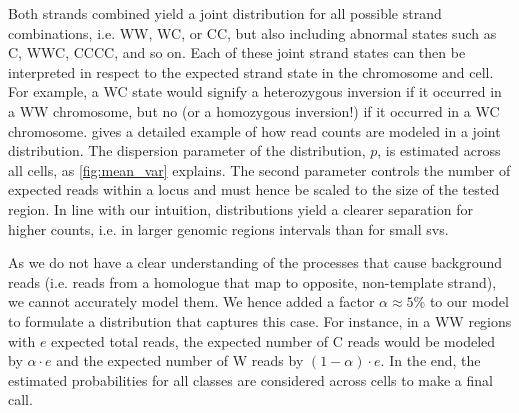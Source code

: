 Both strands combined yield a joint distribution for all possible strand
combinations, i.e. WW, WC, or CC, but also including abnormal states such as C, WWC, CCCC,
and so on. Each of these joint strand states can then be interpreted in respect
to the expected strand state in the chromosome and cell. For example, a WC state would
signify a heterozygous inversion if it occurred in a WW chromosome, but no \sv
(or a homozygous inversion!) if it occurred in a WC chromosome.
 gives a detailed example of how read counts are modeled
in a joint \nb distribution. The dispersion parameter of the \nb distribution,
$p$, is estimated across all cells, as \cref{fig:mean_var} explains. The second
\nb parameter controls the number of expected reads within a locus and must
hence be scaled to the size of the tested region. In line with our intuition,
\nb distributions yield a clearer separation for higher counts, i.e. in larger
genomic regions intervals than for small \acp{sv}.

As we do not have a clear understanding of the processes that cause background
reads (i.e. reads from a homologue that map to opposite, non-template strand),
we cannot accurately model them. We hence added a factor
$\alpha \approx 5\%$ to our model to formulate a \nb distribution that captures
this case. For instance, in a WW regions with $e$ expected total reads, the
expected number of C reads would be modeled by $\alpha \cdot e$ and the expected
number of W reads by $(1-\alpha) \cdot e$. In the end, the
estimated \nb probabilities for all \sv classes are considered across cells to
make a final \sv call.


